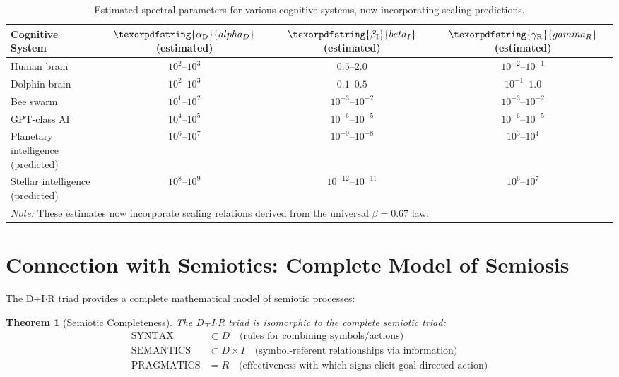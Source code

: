 \documentclass[12pt,a4paper]{article}
\newtheorem{theorem}{Theorem}
\DeclareRobustCommand{\alD}{\texorpdfstring{\ensuremath{\alpha_{\mathrm{D}}}}{alpha_D}}
\DeclareRobustCommand{\beI}{\texorpdfstring{\ensuremath{\beta_{\mathrm{I}}}}{beta_I}}
\DeclareRobustCommand{\gaR}{\texorpdfstring{\ensuremath{\gamma_{\mathrm{R}}}}{gamma_R}}
\begin{document}
	\begin{table}[ht]
		\centering
		\caption{Estimated spectral parameters for various cognitive systems, now incorporating scaling predictions.}
		\label{tab:cognitive-params-updated}
		\begin{tabular}{lccc}
			\toprule
			\textbf{Cognitive System} & \(\alD\) (estimated) & \(\beI\) (estimated) & \(\gaR\) (estimated) \\
			\midrule
			Human brain & \(10^2\)–\(10^3\) & \(0.5\)–\(2.0\) & \(10^{-2}\)–\(10^{-1}\) \\
			Dolphin brain & \(10^2\)–\(10^3\) & \(0.1\)–\(0.5\) & \(10^{-1}\)–\(1.0\) \\
			Bee swarm & \(10^1\)–\(10^2\) & \(10^{-3}\)–\(10^{-2}\) & \(10^{-3}\)–\(10^{-2}\) \\
			GPT-class AI & \(10^4\)–\(10^5\) & \(10^{-6}\)–\(10^{-5}\) & \(10^{-6}\)–\(10^{-5}\) \\
			Planetary intelligence (predicted) & \(10^6\)–\(10^7\) & \(10^{-9}\)–\(10^{-8}\) & \(10^3\)–\(10^4\) \\
			Stellar intelligence (predicted) & \(10^8\)–\(10^9\) & \(10^{-12}\)–\(10^{-11}\) & \(10^6\)–\(10^7\) \\
			\midrule
			\multicolumn{4}{l}{\small\textit{Note:} These estimates now incorporate scaling relations derived from the universal \(\beta = 0.67\) law.} \\
			\bottomrule
		\end{tabular}
	\end{table}
	
	\section{Connection with Semiotics: Complete Model of Semiosis}
	
	The D+I\(\cdot\)R triad provides a complete mathematical model of semiotic processes:
	
	\begin{theorem}[Semiotic Completeness]
		The D+I\(\cdot\)R triad is isomorphic to the complete semiotic triad:
		\begin{align*}
			\text{SYNTAX} &\subset D \quad \text{(rules for combining symbols/actions)} \\
			\text{SEMANTICS} &\subset D \times I \quad \text{(symbol-referent relationships via information)} \\
			\text{PRAGMATICS} &= R \quad \text{(effectiveness with which signs elicit goal-directed action)}
		\end{align*}
	\end{theorem}
	
\end{document}

